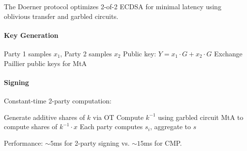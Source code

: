 The Doerner protocol \cite{doerner2018} optimizes 2-of-2 ECDSA for minimal latency using oblivious transfer and garbled circuits.

\paragraph{Key Generation}
\begin{algorithmic}[1]
\State Party 1 samples $x_1$, Party 2 samples $x_2$
\State Public key: $Y = x_1 \cdot G + x_2 \cdot G$
\State Exchange Paillier public keys for MtA
\end{algorithmic}

\paragraph{Signing} Constant-time 2-party computation:
\begin{algorithmic}[1]
\State Generate additive shares of $k$ via OT
\State Compute $k^{-1}$ using garbled circuit
\State MtA to compute shares of $k^{-1} \cdot x$
\State Each party computes $s_i$, aggregate to $s$
\end{algorithmic}

Performance: $\sim 5$ms for 2-party signing vs. $\sim 15$ms for CMP.

